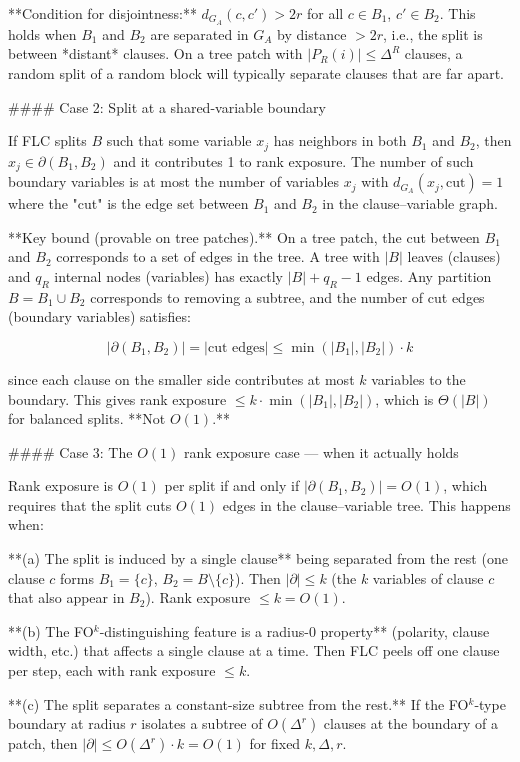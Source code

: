 **Condition for disjointness:** $d_{G_A}(c,c') > 2r$ for all $c \in B_1$, $c' \in B_2$. This holds when $B_1$ and $B_2$ are separated in $G_A$ by distance $> 2r$, i.e., the split is between *distant* clauses. On a tree patch with $|P_R(i)| \leq \Delta^R$ clauses, a random split of a random block will typically separate clauses that are far apart.

#### Case 2: Split at a shared-variable boundary

If FLC splits $B$ such that some variable $x_j$ has neighbors in both $B_1$ and $B_2$, then $x_j \in \partial(B_1, B_2)$ and it contributes 1 to rank exposure. The number of such boundary variables is at most the number of variables $x_j$ with $d_{G_A}(x_j, \text{cut}) = 1$ where the "cut" is the edge set between $B_1$ and $B_2$ in the clause–variable graph.

**Key bound (provable on tree patches).** On a tree patch, the cut between $B_1$ and $B_2$ corresponds to a set of edges in the tree. A tree with $|B|$ leaves (clauses) and $q_R$ internal nodes (variables) has exactly $|B| + q_R - 1$ edges. Any partition $B = B_1 \cup B_2$ corresponds to removing a subtree, and the number of cut edges (boundary variables) satisfies:

$$|\partial(B_1, B_2)| = |\text{cut edges}| \leq \min(|B_1|, |B_2|) \cdot k$$

since each clause on the smaller side contributes at most $k$ variables to the boundary. This gives rank exposure $\leq k \cdot \min(|B_1|, |B_2|)$, which is $\Theta(|B|)$ for balanced splits. **Not $O(1)$.**

#### Case 3: The $O(1)$ rank exposure case — when it actually holds

Rank exposure is $O(1)$ per split if and only if $|\partial(B_1, B_2)| = O(1)$, which requires that the split cuts $O(1)$ edges in the clause–variable tree. This happens when:

**(a) The split is induced by a single clause** being separated from the rest (one clause $c$ forms $B_1 = \{c\}$, $B_2 = B \setminus \{c\}$). Then $|\partial| \leq k$ (the $k$ variables of clause $c$ that also appear in $B_2$). Rank exposure $\leq k = O(1)$.

**(b) The FO$^k$-distinguishing feature is a radius-0 property** (polarity, clause width, etc.) that affects a single clause at a time. Then FLC peels off one clause per step, each with rank exposure $\leq k$.

**(c) The split separates a constant-size subtree from the rest.** If the FO$^k$-type boundary at radius $r$ isolates a subtree of $O(\Delta^r)$ clauses at the boundary of a patch, then $|\partial| \leq O(\Delta^r) \cdot k = O(1)$ for fixed $k, \Delta, r$.

